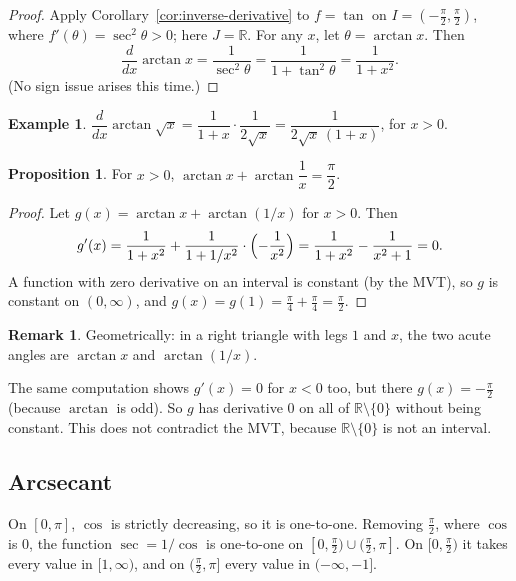 \documentclass[12pt,letterpaper]{article}
\theoremstyle{definition}
\newtheorem{proposition}[theorem]{Proposition}
\newtheorem{example}[theorem]{Example}
\newtheorem*{remark}{Remark}
\begin{document}
\begin{proof}
  Apply Corollary~\ref{cor:inverse-derivative} to $f=\tan$ on
  $I=(-\frac\pi2,\frac\pi2)$, where $f'(\theta)=\sec^2\theta>0$; here
  $J=\mathbb{R}$. For any $x$, let $\theta=\arctan x$. Then
  \[
    \frac{d}{dx}\arctan x=\frac{1}{\sec^2\theta}
      =\frac{1}{1+\tan^2\theta}=\frac{1}{1+x^2}.
  \]
  (No sign issue arises this time.)
\end{proof}

\begin{example}
  $\dfrac{d}{dx}\arctan\sqrt{x}=\dfrac{1}{1+x}\cdot\dfrac{1}{2\sqrt{x}}
  =\dfrac{1}{2\sqrt{x}\,(1+x)}$, for $x>0$.
\end{example}

\begin{proposition}
  For $x>0$, $\arctan x+\arctan\dfrac1x=\dfrac\pi2$.
\end{proposition}

\begin{proof}
  Let $g(x)=\arctan x+\arctan(1/x)$ for $x>0$. Then
  \[
    g'(x)=\frac{1}{1+x^2}+\frac{1}{1+1/x^2}\cdot\Bigl(-\frac{1}{x^2}\Bigr)
      =\frac{1}{1+x^2}-\frac{1}{x^2+1}=0.
  \]
  A function with zero derivative on an interval is constant (by the MVT), so
  $g$ is constant on $(0,\infty)$, and $g(x)=g(1)=\frac\pi4+\frac\pi4
  =\frac\pi2$.
\end{proof}

\begin{remark}
  Geometrically: in a right triangle with legs $1$ and $x$, the two acute
  angles are $\arctan x$ and $\arctan(1/x)$.

  The same computation shows $g'(x)=0$ for $x<0$ too, but there
  $g(x)=-\frac\pi2$ (because $\arctan$ is odd). So $g$ has derivative $0$
  on all of $\mathbb{R}\setminus\{0\}$ without being constant. This does not
  contradict the MVT, because $\mathbb{R}\setminus\{0\}$ is not an interval.
\end{remark}

\subsection{Arcsecant}

On $[0,\pi]$, $\cos$ is strictly decreasing, so it is one-to-one. Removing
$\frac\pi2$, where $\cos$ is $0$, the function $\sec=1/\cos$ is one-to-one on
$[0,\frac\pi2)\cup(\frac\pi2,\pi]$. On $[0,\frac\pi2)$ it takes every value in
$[1,\infty)$, and on $(\frac\pi2,\pi]$ every value in $(-\infty,-1]$.
\end{document}
